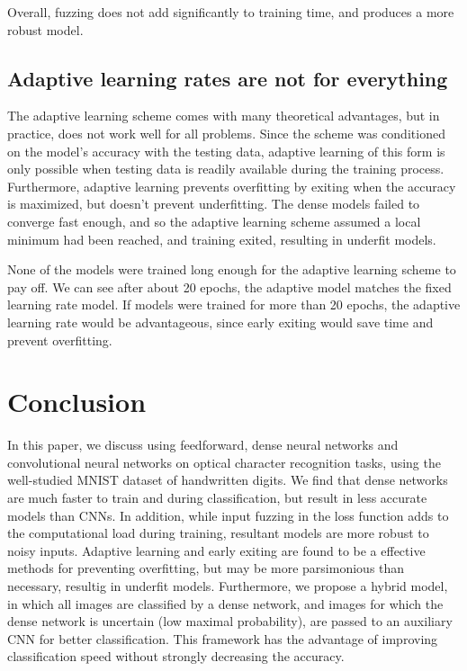 \documentclass{article}
\begin{document}
Overall, fuzzing does not add significantly to training time, and produces a more robust model.

\subsection{Adaptive learning rates are not for everything}

The adaptive learning scheme comes with many theoretical advantages, but in practice, does not work well for all problems.
Since the scheme was conditioned on the model's accuracy with the testing data,
adaptive learning of this form is only possible when testing data is readily available during the training process.
Furthermore, adaptive learning prevents overfitting by exiting when the accuracy is maximized, but doesn't prevent underfitting.
The dense models failed to converge fast enough,
and so the adaptive learning scheme assumed a local minimum had been reached,
and training exited, resulting in underfit models.

None of the models were trained long enough for the adaptive learning scheme to pay off.
We can see after about 20 epochs, the adaptive model matches the fixed learning rate model.
If models were trained for more than 20 epochs, the adaptive learning rate would be advantageous,
since early exiting would save time and prevent overfitting.

\section{Conclusion}

In this paper, we discuss using feedforward, dense neural networks and convolutional neural networks
on optical character recognition tasks, using the well-studied MNIST dataset of handwritten digits.
We find that dense networks are much faster to train and during classification, but result in less accurate models than CNNs.
In addition, while input fuzzing in the loss function adds to the computational load during training,
resultant models are more robust to noisy inputs.
Adaptive learning and early exiting are found to be a effective methods for preventing overfitting,
but may be more parsimonious than necessary, resultig in underfit models.
Furthermore, we propose a hybrid model, in which all images are classified by a dense network,
and images for which the dense network is uncertain (low maximal probability),
are passed to an auxiliary CNN for better classification.
This framework has the advantage of improving classification speed without strongly decreasing the accuracy.


\end{document}
